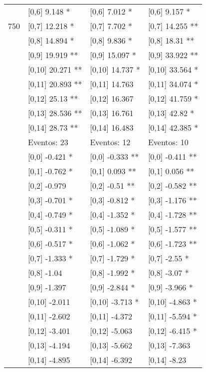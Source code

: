 \begin{table}
\begin{tabular}[t]{llll}
 & {}[0,6] 9.148 * & {}[0,6] 7.012 * & {}[0,6] 9.157 *\\
750 & {}[0,7] 12.218 * & {}[0,7] 7.702 * & {}[0,7] 14.255 **\\
\addlinespace
 & {}[0,8] 14.894 * & {}[0,8] 9.836 * & {}[0,8] 18.31 **\\
 & {}[0,9] 19.919 ** & {}[0,9] 15.097 * & {}[0,9] 33.922 **\\
 & {}[0,10] 20.271 ** & {}[0,10] 14.737 * & {}[0,10] 33.564 *\\
 & {}[0,11] 20.893 ** & {}[0,11] 14.763 & {}[0,11] 34.074 *\\
 & {}[0,12] 25.13 ** & {}[0,12] 16.367 & {}[0,12] 41.759 *\\
\addlinespace
 & {}[0,13] 28.536 ** & {}[0,13] 16.761 & {}[0,13] 42.82 *\\
 & {}[0,14] 28.73 ** & {}[0,14] 16.483 & {}[0,14] 42.385 *\\
 & Eventos:  23 & Eventos:  12 & Eventos:  10\\
 & {}[0,0] -0.421 * & {}[0,0] -0.333 ** & {}[0,0] -0.411 **\\
 & {}[0,1] -0.762 * & {}[0,1] 0.093 ** & {}[0,1] 0.056 **\\
\addlinespace
 & {}[0,2] -0.979 & {}[0,2] -0.51 ** & {}[0,2] -0.582 **\\
 & {}[0,3] -0.701 * & {}[0,3] -0.812 * & {}[0,3] -1.176 **\\
 & {}[0,4] -0.749 * & {}[0,4] -1.352 * & {}[0,4] -1.728 **\\
 & {}[0,5] -0.311 * & {}[0,5] -1.089 * & {}[0,5] -1.577 **\\
 & {}[0,6] -0.517 * & {}[0,6] -1.062 * & {}[0,6] -1.723 **\\
\addlinespace
1000 & {}[0,7] -1.333 * & {}[0,7] -1.729 * & {}[0,7] -2.55 *\\
 & {}[0,8] -1.04 & {}[0,8] -1.992 * & {}[0,8] -3.07 *\\
 & {}[0,9] -1.397 & {}[0,9] -2.844 * & {}[0,9] -3.966 *\\
 & {}[0,10] -2.011 & {}[0,10] -3.713 * & {}[0,10] -4.863 *\\
 & {}[0,11] -2.602 & {}[0,11] -4.372 & {}[0,11] -5.594 *\\
\addlinespace
 & {}[0,12] -3.401 & {}[0,12] -5.063 & {}[0,12] -6.415 *\\
 & {}[0,13] -4.194 & {}[0,13] -5.662 & {}[0,13] -7.363\\
 & {}[0,14] -4.895 & {}[0,14] -6.392 & {}[0,14] -8.23\\
\bottomrule
\end{tabular}
\end{table}
